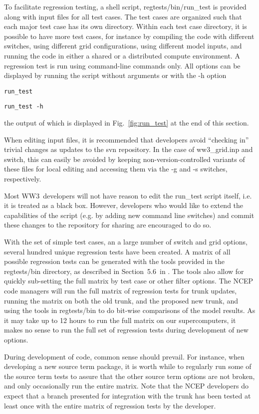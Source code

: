 \documentclass[12pt]{article}
\newcommand{\manref}{tol:MMABmanual}
\newcommand{\manregtestsec}{5.6}
\newcommand{\ws}{WW3}
\newcommand{\file}{\sf}
\newcommand{\code}{\tt}
\newcommand{\command}[1]{\begin{center}{\code #1}\end{center}}
\begin{document}
To facilitate regression testing, a shell script, {\file
  regtests/bin/run\_test} is provided along with input files for all test
cases. The test cases are organized such that each major test case has its own
directory. Within each test case directory, it is possible to have more test
cases, for instance by compiling the code with different switches, using
different grid configurations, using different model inputs, and running the
code in either a shared or a distributed compute environment. A regression
test is run using command-line commands only. All options can be displayed by
running the script without arguments or with the {\file -h} option
\command{run\_test} \command{run\_test -h} the output of which is displayed in
Fig.~\ref{fig:run_test} at the end of this section.

When editing input files, it is recommended that developers avoid ``checking
in'' trivial changes as updates to the svn repository. In the case of {\file
  ww3\_grid.inp} and {\file switch}, this can easily be avoided by keeping
non-version-controlled variants of these files for local editing and accessing
them via the -g and -s switches, respectively.

Most \ws\ developers will not have reason to edit the {\file run\_test} script
itself, i.e. it is treated as a black box. However, developers who would like
to extend the capabilities of the script (e.g. by adding new command line
switches) and commit these changes to the repository for sharing are
encouraged to do so.

\vspace{\baselineskip} \noindent With the set of simple test cases, an a large
number of switch and grid options, several hundred unique regression tests
have been created. A matrix of all possible regression tests can be generated
with the tools provided in the {\file regtests/bin} directory, as described in
Section~\manregtestsec\ in \cite{\manref}. The tools also allow for quickly
sub-setting the full matrix by test case or other filter options. The NCEP
code managers will run the full matrix of regression tests for trunk updates,
running the matrix on both the old trunk, and the proposed new trunk, and
using the tools in {\file regtests/bin} to do bit-wise comparisons of the
model results. As it may take up to 12 hours to run the full matrix on our
supercomputers, it makes no sense to run the full set of regression tests
during development of new options.

During development of code, common sense should prevail. For instance, when
developing a new source term package, it is worth while to regularly run some
of the source term tests to assure that the other source term options are not
broken, and only occasionally run the entire matrix. Note that the NCEP
developers do expect that a branch presented for integration with the trunk
has been tested at least once with the entire matrix of regression tests by
the developer.
\end{document}
